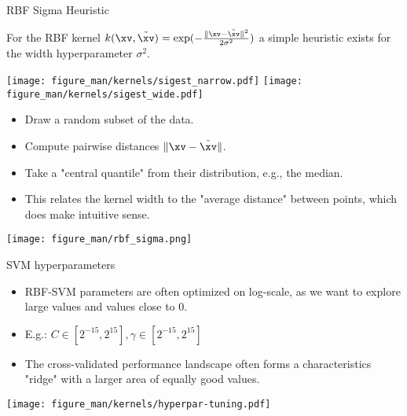 \begin{vbframe}{RBF Sigma Heuristic}

For the RBF kernel $k(\xv, \tilde \xv) = \exp(-\frac{\|\xv - \tilde \xv \|^2}{2\sigma^2})$ a simple heuristic exists for the width hyperparameter $\sigma^2$. 

\lz


\begin{center}
  \texttt{[image: figure\_man/kernels/sigest\_narrow.pdf]}
  \texttt{[image: figure\_man/kernels/sigest\_wide.pdf]}
\end{center}  
\begin{footnotesize} 

\end{footnotesize}


\framebreak


\begin{itemize}
  \item Draw a random subset of the data.
  \item Compute pairwise distances $\|\xv - \tilde \xv \|$.
  \item Take a "central quantile" from their distribution, e.g., the median.
  \item This relates the kernel width to the "average distance" between points,
    which does make intuitive sense.
\end{itemize}

\begin{center}
\texttt{[image: figure\_man/rbf\_sigma.png]}
\end{center}


\framebreak

\end{vbframe}

\begin{vbframe}{SVM hyperparameters}
\begin{itemize}
\item RBF-SVM parameters are often optimized on log-scale, as we want to explore
  large values and values close to 0.
\item E.g.: $C \in [2^{-15}, 2^{15}], \gamma \in [2^{-15}, 2^{15}]$
\item The cross-validated performance landscape often forms
  a characteristics "ridge" with a larger area of equally good values.
\end{itemize}

\begin{center}
  \texttt{[image: figure\_man/kernels/hyperpar-tuning.pdf]}
\end{center}

\end{vbframe}

\endlecture

